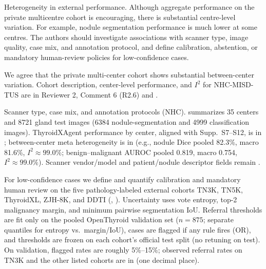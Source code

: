 \begin{reviewercomment}
Heterogeneity in external performance. Although aggregate performance on the private multicentre cohort is encouraging, there is substantial centre-level variation. For example, nodule segmentation performance is much lower at some centres. The authors should investigate associations with scanner type, image quality, case mix, and annotation protocol, and define calibration, abstention, or mandatory human-review policies for low-confidence cases.
\end{reviewercomment}
\begin{authorresponse}
We agree that the private multi-center cohort shows substantial between-center variation. Cohort description, center-level performance, and $I^2$ for NHC-MISD-TUS are in Reviewer 2, Comment 6 (R2.6) and .\par
Scanner type, case mix, and annotation protocols (NHC).  summarizes 35 centers and 8721 gland test images (6384 nodule-segmentation and 4999 classification images). ThyroidXAgent performance by center, aligned with Supp.\ S7--S12, is in ; between-center meta heterogeneity is in  (e.g., nodule Dice pooled 82.3\%, macro 81.6\%, $I^2{\approx}99.0\%$; benign--malignant AUROC pooled 0.819, macro 0.754, $I^2{\approx}99.0\%$). Scanner vendor/model and patient/nodule descriptor fields remain .\par
For low-confidence cases we define and quantify calibration and mandatory human review on the five pathology-labeled external cohorts TN3K, TN5K, ThyroidXL, ZJH-8K, and DDTI (, ). Uncertainty uses vote entropy, top-2 malignancy margin, and minimum pairwise segmentation IoU. Referral thresholds are fit only on the pooled OpenThyroid validation set ($n{=}875$; separate quantiles for entropy vs.\ margin/IoU), cases are flagged if any rule fires (OR), and thresholds are frozen on each cohort's official test split (no retuning on test). On validation, flagged rates are roughly 5\%--15\%; observed referral rates on TN3K and the other listed cohorts are in  (one decimal place).\par

\end{authorresponse}
